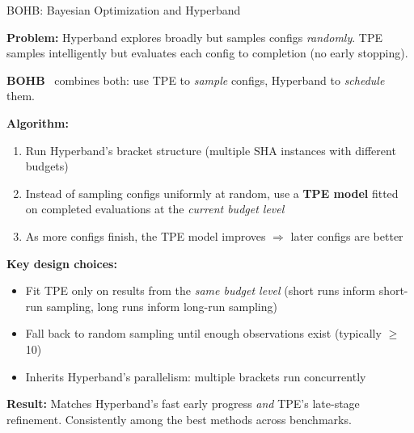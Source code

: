 \begin{frame}{BOHB: Bayesian Optimization and Hyperband}

  \textbf{Problem:} Hyperband explores broadly but samples configs \emph{randomly}. TPE samples intelligently but evaluates each config to completion (no early stopping).

  \vspace{0.3em}
  \textbf{BOHB}~\cite{falkner2018bohb} combines both: use TPE to \emph{sample} configs, Hyperband to \emph{schedule} them.

  \vspace{0.3em}
  \textbf{Algorithm:}
  \begin{enumerate}
    \item Run Hyperband's bracket structure (multiple SHA instances with different budgets)
    \item Instead of sampling configs uniformly at random, use a \textbf{TPE model} fitted on completed evaluations at the \emph{current budget level}
    \item As more configs finish, the TPE model improves $\Rightarrow$ later configs are better
  \end{enumerate}

  \vspace{0.3em}
  \textbf{Key design choices:}
  \begin{itemize}
    \item Fit TPE only on results from the \emph{same budget level} (short runs inform short-run sampling, long runs inform long-run sampling)
    \item Fall back to random sampling until enough observations exist (typically $\geq$\,10)
    \item Inherits Hyperband's parallelism: multiple brackets run concurrently
  \end{itemize}

  \vspace{0.3em}
  \textbf{Result:} Matches Hyperband's fast early progress \emph{and} TPE's late-stage refinement. Consistently among the best methods across benchmarks.

\end{frame}

